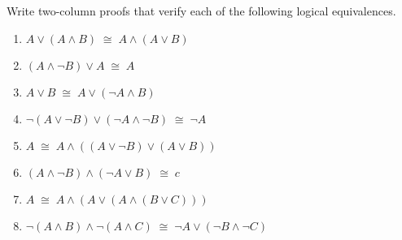 Write two-column proofs that verify each of the following
logical equivalences.

\begin{enumerate}
\item $A \lor (A \land B) \; \cong \; A \land (A \lor B)$
\medskip

\item $(A \land {\lnot}B) \lor A \; \cong \; A$
\medskip

\item $A \lor B \; \cong \; A \lor ({\lnot}A \land B)$
\medskip

\item ${\lnot}(A \lor {\lnot}B) \lor ({\lnot}A \land {\lnot}B) \; \cong \; {\lnot}A$
\medskip

\item $A \; \cong \; A \land ((A \lor {\lnot}B) \lor (A \lor B))$
\medskip

\item $(A \land {\lnot}B) \land ({\lnot}A \lor B) \; \cong \; c$
\medskip

\item $A \; \cong \; A \land (A \lor (A \land (B \lor C)))$
\medskip

\item ${\lnot}(A \land B) \land {\lnot}(A \land C) \; \cong \; {\lnot}A \lor ({\lnot}B \land {\lnot}C)$
\medskip

\end{enumerate}

\workbookpagebreak

\rule{0pt}{0pt}

\workbookpagebreak